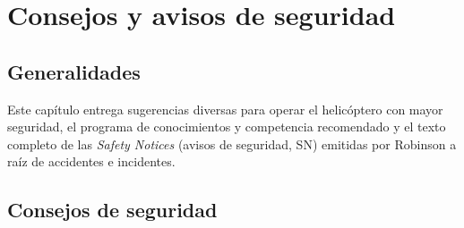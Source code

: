 \chapter{Consejos y avisos de seguridad}
\label{cap:seguridad}


\section{Generalidades}

Este capítulo entrega sugerencias diversas para operar el helicóptero con mayor seguridad, el programa de conocimientos y competencia recomendado y el texto completo de las \emph{Safety Notices} (avisos de seguridad, SN) emitidas por Robinson a raíz de accidentes e incidentes.

\section{Consejos de seguridad}

